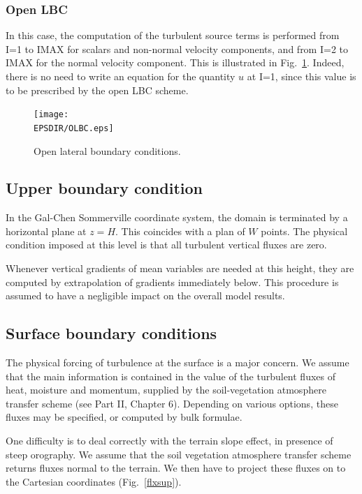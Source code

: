 \subsubsection{Open LBC}

In this case, the computation of the turbulent source terms is performed from
I=1 to IMAX for scalars and non-normal velocity components, and from I=2 to
IMAX for the normal velocity component. This is illustrated in Fig.~\ref{olbc}.
Indeed, there is no need to write an equation for the quantity $u$ at I=1,
since this value is to be prescribed by the open LBC scheme.

\begin{figure}[!ht]
\centerline{\texttt{[image: \\EPSDIR/OLBC.eps]}}
\caption{Open lateral boundary conditions.}
\label{olbc}
\end{figure}


\subsection{Upper boundary condition}

In the Gal-Chen Sommerville coordinate system,
the domain is terminated by a horizontal plane
at $z=H$. This coincides with a plan of $W$ points. The physical
condition imposed at this level is that all turbulent vertical fluxes are
zero.

Whenever vertical gradients of mean variables are needed at this height, they
are computed by extrapolation of gradients immediately below. This procedure
is assumed to have a negligible impact on the overall model results.

\subsection{Surface boundary conditions}

The physical forcing of turbulence at the surface is a major concern.
We assume that the main information is contained in the value of the
turbulent fluxes of heat, moisture and momentum, supplied by the
soil-vegetation atmosphere transfer scheme (see Part II, Chapter 6). Depending
on various options, these fluxes may be specified, or computed by bulk
formulae.

One difficulty is to deal correctly with the terrain slope effect, in
presence of steep orography. We assume that the soil vegetation atmosphere
transfer scheme returns fluxes normal to the terrain. We then have to
project these fluxes on to the Cartesian coordinates (Fig.~\ref{flxsup}).

